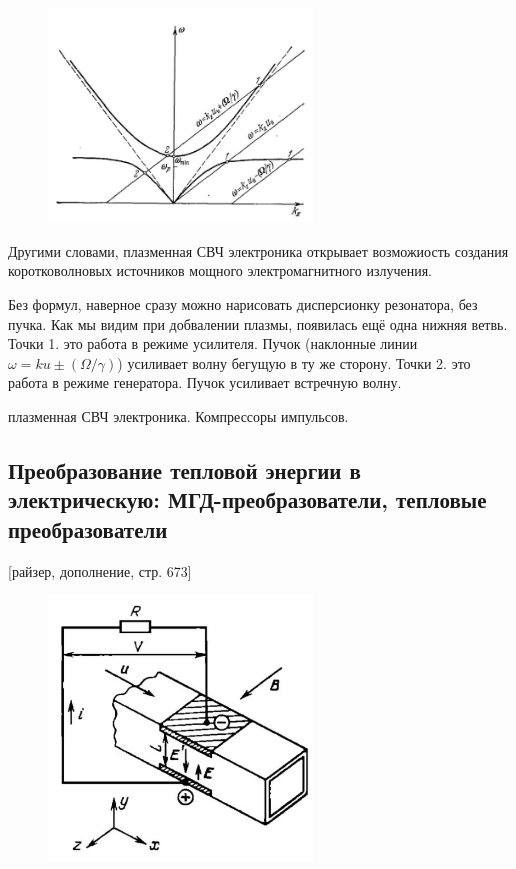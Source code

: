 \documentclass[10pt, a4paper]{article}
\begin{document}
\begin{figure}[h!]
	\begin{center}
		\includegraphics[width=70mm]{dispers_14_3.JPG}
	\end{center}
\end{figure}

Другими словами, плазменная СВЧ электроника открывает возможиость создания коротковолновых источников мощного электромагнитного излучения.


Без формул, наверное сразу можно нарисовать дисперсионку резонатора, без пучка.  Как мы видим при добвалении плазмы, появилась ещё одна нижняя ветвь. Точки 1. это работа в режиме усилителя. Пучок (наклонные линии $\omega=ku\pm (\Omega/\gamma)$) усиливает волну бегущую в ту же сторону. Точки 2. это работа в режиме генератора. Пучок усиливает встречную волну.



плазменная СВЧ электроника.
Компрессоры импульсов.


\subsection{Преобразование тепловой энергии в электрическую: МГД-преобразователи, тепловые преобразователи}

[райзер, дополнение, стр. 673]

\begin{figure}[h!]
	\begin{center}
		\includegraphics[width=70mm]{MGD_generator.JPG}
	\end{center}
\end{figure}
\end{document}
